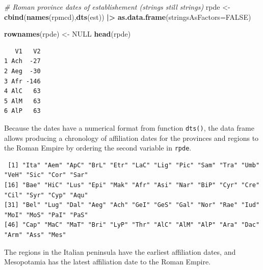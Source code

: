 \documentclass[a4paper,11pt]{memoir}
\newenvironment{Shaded}{\begin{snugshade}}{\end{snugshade}}
\newcommand{\CommentTok}[1]{\textcolor[rgb]{0.56,0.35,0.01}{\textit{#1}}}
\newcommand{\DataTypeTok}[1]{\textcolor[rgb]{0.13,0.29,0.53}{#1}}
\newcommand{\DecValTok}[1]{\textcolor[rgb]{0.00,0.00,0.81}{#1}}
\newcommand{\ErrorTok}[1]{\textcolor[rgb]{0.64,0.00,0.00}{\textbf{#1}}}
\newcommand{\KeywordTok}[1]{\textcolor[rgb]{0.13,0.29,0.53}{\textbf{#1}}}
\newcommand{\NormalTok}[1]{#1}
\newcommand{\OperatorTok}[1]{\textcolor[rgb]{0.81,0.36,0.00}{\textbf{#1}}}
\newcommand{\OtherTok}[1]{\textcolor[rgb]{0.56,0.35,0.01}{#1}}
\newcommand{\StringTok}[1]{\textcolor[rgb]{0.31,0.60,0.02}{#1}}
\begin{document}
\begin{Shaded}
\begin{Highlighting}[]
\CommentTok{# Roman province dates of establishement (strings still strings)}
\NormalTok{rpde <-}\StringTok{ }\KeywordTok{cbind}\NormalTok{(}\KeywordTok{names}\NormalTok{(rpmcd),}\KeywordTok{dts}\NormalTok{(est)) }\OperatorTok{|}\ErrorTok{>}
\StringTok{  }\KeywordTok{as.data.frame}\NormalTok{(}\DataTypeTok{stringsAsFactors=}\OtherTok{FALSE}\NormalTok{)}
\end{Highlighting}
\end{Shaded}

\begin{Shaded}
\begin{Highlighting}[]
\KeywordTok{rownames}\NormalTok{(rpde) <-}\StringTok{ }\OtherTok{NULL}
\KeywordTok{head}\NormalTok{(rpde)}
\end{Highlighting}
\end{Shaded}

\begin{verbatim}
   V1   V2
1 Ach  -27
2 Aeg  -30
3 Afr -146
4 AlC   63
5 AlM   63
6 AlP   63
\end{verbatim}

Because the dates have a numerical format from function \texttt{dts()},
the data frame allows producing a chronology of affiliation dates for
the provinces and regions to the Roman Empire by ordering the second
variable in \texttt{rpde}.

\begin{Shaded}
\end{Shaded}

\begin{verbatim}
 [1] "Ita" "Aem" "ApC" "BrL" "Etr" "LaC" "Lig" "Pic" "Sam" "Tra" "Umb" "VeH" "Sic" "Cor" "Sar"
[16] "Bae" "HiC" "Lus" "Epi" "Mak" "Afr" "Asi" "Nar" "BiP" "Cyr" "Cre" "Cil" "Syr" "Cyp" "Aqu"
[31] "Bel" "Lug" "Dal" "Aeg" "Ach" "GeI" "GeS" "Gal" "Nor" "Rae" "Iud" "MoI" "MoS" "PaI" "PaS"
[46] "Cap" "MaC" "MaT" "Bri" "LyP" "Thr" "AlC" "AlM" "AlP" "Ara" "Dac" "Arm" "Ass" "Mes"
\end{verbatim}

The regions in the Italian peninsula have the earliest affiliation
dates, and Mesopotamia has the latest affiliation date to the Roman
Empire.
\end{document}
